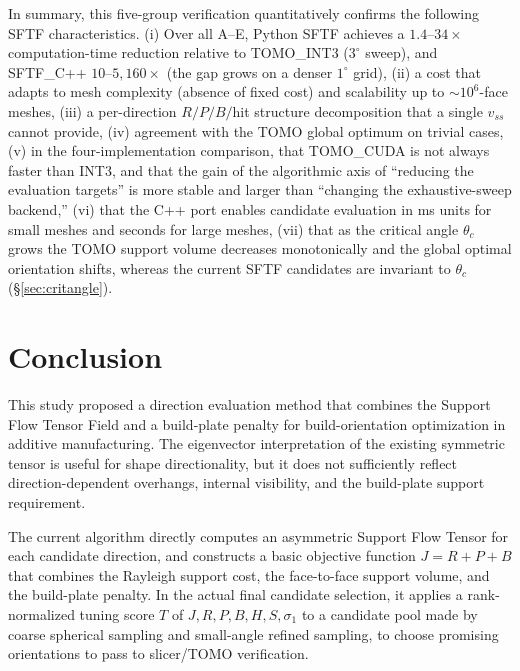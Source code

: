 \documentclass[11pt,a4paper]{article}
\begin{document}
In summary, this five-group verification quantitatively confirms the following SFTF characteristics.
(i) Over all A--E, Python SFTF achieves a $1.4$--$34\times$ computation-time reduction relative to TOMO\_INT3 ($3^\circ$ sweep),
and SFTF\_C++ $10$--$5{,}160\times$ (the gap grows on a denser $1^\circ$ grid),
(ii) a cost that adapts to mesh complexity (absence of fixed cost) and scalability up to $\sim$$10^6$-face meshes,
(iii) a per-direction $R/P/B/$hit structure decomposition that a single $v_{ss}$ cannot provide,
(iv) agreement with the TOMO global optimum on trivial cases,
(v) in the four-implementation comparison, that TOMO\_CUDA is not always faster than INT3, and
that the gain of the algorithmic axis of ``reducing the evaluation targets'' is more stable and larger than ``changing the exhaustive-sweep backend,''
(vi) that the C++ port enables candidate evaluation in ms units for small meshes and seconds for large meshes,
(vii) that as the critical angle $\theta_c$ grows the TOMO support volume decreases monotonically and the global optimal orientation shifts, whereas
the current SFTF candidates are invariant to $\theta_c$ (\S\ref{sec:critangle}).

\section{Conclusion}

This study proposed a direction evaluation method that combines the Support Flow Tensor Field and a build-plate penalty for build-orientation optimization in additive manufacturing.
The eigenvector interpretation of the existing symmetric tensor is useful for shape directionality, but
it does not sufficiently reflect direction-dependent overhangs, internal visibility, and the build-plate support requirement.

The current algorithm directly computes an asymmetric Support Flow Tensor for each candidate direction, and
constructs a basic objective function $J=R+P+B$ that combines the Rayleigh support cost, the face-to-face support volume, and the build-plate penalty.
In the actual final candidate selection, it applies a rank-normalized tuning score $T$ of $J,R,P,B,H,S,\sigma_1$
to a candidate pool made by coarse spherical sampling and small-angle refined sampling,
to choose promising orientations to pass to slicer/TOMO verification.
\end{document}
